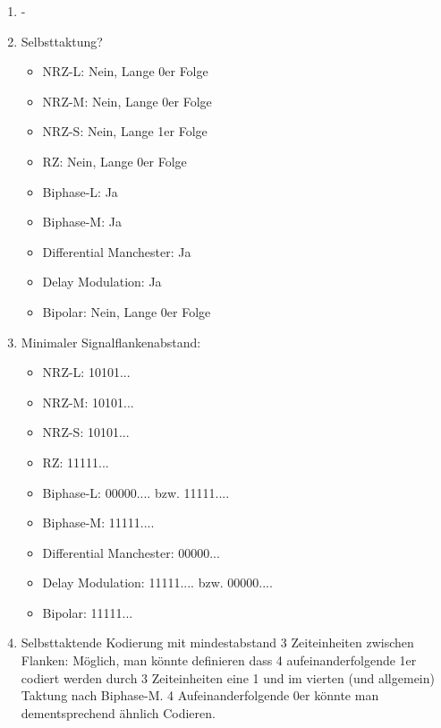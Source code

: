 \documentclass{scrartcl}
\begin{document}
\begin{enumerate}
    \item -
    \item Selbsttaktung?
        \begin{itemize}
            \item NRZ-L: Nein, Lange 0er Folge
            \item NRZ-M: Nein, Lange 0er Folge
            \item NRZ-S: Nein, Lange 1er Folge
            \item RZ: Nein, Lange 0er Folge
            \item Biphase-L: Ja
            \item Biphase-M: Ja
            \item Differential Manchester: Ja
            \item Delay Modulation: Ja
            \item Bipolar: Nein, Lange 0er Folge
        \end{itemize}
    \item Minimaler Signalflankenabstand:
        \begin{itemize}
            \item NRZ-L: 10101...
            \item NRZ-M: 10101...
            \item NRZ-S: 10101...
            \item RZ: 11111...
            \item Biphase-L: 00000.... bzw. 11111....
            \item Biphase-M: 11111....
            \item Differential Manchester: 00000...
            \item Delay Modulation: 11111.... bzw. 00000....
            \item Bipolar: 11111...
        \end{itemize}
    \item Selbsttaktende Kodierung mit mindestabstand 3 Zeiteinheiten zwischen Flanken:
        Möglich, man könnte definieren dass 4 aufeinanderfolgende 1er codiert werden
        durch 3 Zeiteinheiten eine 1 und im vierten (und allgemein) Taktung nach Biphase-M.
        4 Aufeinanderfolgende 0er könnte man dementsprechend ähnlich Codieren.
\end{enumerate}
\end{document}

